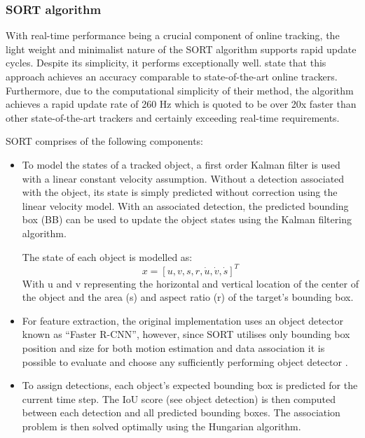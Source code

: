 \documentclass[a4paper,twoside,12pt]{report}
\begin{document}
\subsubsection{SORT algorithm}

With real-time performance being a crucial component of online tracking, the light weight and minimalist nature of the SORT algorithm supports rapid update cycles. Despite its simplicity, it performs exceptionally well. \cite{sort} state that this approach achieves an accuracy comparable to state-of-the-art online trackers. Furthermore, due to the computational simplicity of their method, the algorithm achieves a rapid update rate of 260 Hz which is quoted to be over 20x faster than other state-of-the-art trackers and certainly exceeding real-time requirements.

SORT comprises of the following components:
\begin{itemize}
	\item To model the states of a tracked object, a first order Kalman filter is used with a linear constant velocity assumption. Without a detection associated with the object, its state is simply predicted without correction using the linear velocity model. With an associated detection, the predicted bounding box (BB) can be used to update the object states using the Kalman filtering algorithm.

	The state of each object is modelled as:
\begin{equation}
x = [u,v,s,r,\dot{u},\dot{v},\dot{s}]^T
\end{equation}
With u and v representing the horizontal and vertical location of the center of the object and the area (s) and aspect ratio (r) of the target’s bounding box.

	\item For feature extraction, the original implementation uses an object detector known as ``Faster R-CNN'', however, since SORT utilises only bounding box position and size for both motion estimation and data association it is possible to evaluate and choose any sufficiently performing object detector \citep{sort}.
	\item To assign detections, each object's expected bounding box is predicted for the current time step. The IoU score (see object detection) is then computed between each detection and all predicted bounding boxes. The association problem is then solved optimally using the Hungarian algorithm.
\end{itemize}
\end{document}
